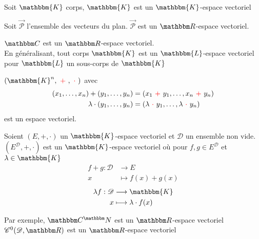 \begin{exm}
	Soit $\mathbbm{K}$ corps, $\mathbbm{K}$ est un $\mathbbm{K}$-espace vectoriel
\end{exm}

\begin{exm}
	Soit $\vec{\mathcal{P}}$ l'ensemble des vecteurs du plan. $\vec{\mathcal{P}}$ est un $\R$-espace vectoriel.
\end{exm}

\begin{exm}
	$\C$ est un $\R$-espace vectoriel.\\
	En généralisant, tout corps $\mathbbm{K}$ est un $\mathbbm{L}$-espace vectoriel pour $\mathbbm{L}$ un sous-corps de $\mathbbm{K}$
\end{exm}

\newcommand{\red}[1]{{\color{red} ~#1~}}
\begin{exm}
	$\left( \mathbbm{K}^n,\red+,\red\cdot\right)$ avec
	\begin{align*}
		(x_1, \ldots, x_n) + (y_1, \ldots, y_n) &= (x_1\red+y_1, \ldots, x_n \red+ y_n)\\
		\lambda \cdot (y_1, \ldots, y_n) &= (\lambda \red\cdot y_1, \ldots, \lambda \red\cdot y_n)
	\end{align*}
	est un espace vectoriel.
\end{exm}

\begin{exm}
	Soient $(E,+,\cdot)$ un $\mathbbm{K}$-espace vectoriel et $\mathcal{D}$ un ensemble non vide.\\
	$(E^\mathcal{D},+,\cdot)$ est un $\mathbbm{K}$-espace vectoriel où pour $f,g \in E^\mathcal{D}$ et $\lambda\in \mathbbm{K}$ 
	\begin{align*}
		f+g: \mathcal{D} &\longrightarrow E \\
		x &\longmapsto f(x) + g(x)
	\end{align*}
	\begin{align*}
		\lambda f: \mathcal{D} &\longrightarrow \mathbbm{K} \\
		 x &\longmapsto \lambda \cdot f(x) 
	\end{align*}

	Par exemple, $\C^\N$ est un $\R$-espace vectoriel\\
	$\mathcal{C}^0(\mathcal{D},\R)$ est un $\R$-espace vectoriel
\end{exm}

